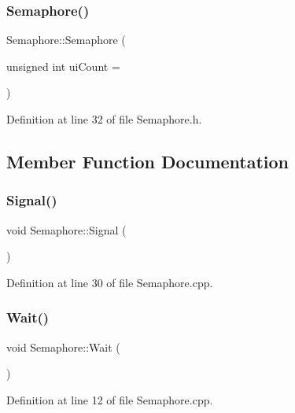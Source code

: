 \subsubsection{\texorpdfstring{Semaphore()}{Semaphore()}}
{\footnotesize\ttfamily Semaphore\+::\+Semaphore (\begin{DoxyParamCaption}\item[{unsigned int}]{ui\+Count = {} }\end{DoxyParamCaption})\hspace{0.3cm}{\ttfamily [inline]}}



Definition at line 32 of file Semaphore.\+h.



\subsection{Member Function Documentation}
\mbox{\label{class_semaphore_a86f92f738b4486439b296d8e235895f2}} 
\subsubsection{\texorpdfstring{Signal()}{Signal()}}
{\footnotesize\ttfamily void Semaphore\+::\+Signal (\begin{DoxyParamCaption}{ }\end{DoxyParamCaption})}



Definition at line 30 of file Semaphore.\+cpp.

\mbox{\label{class_semaphore_a72aabebf026e3a8b1f3e4d0fa8ee1eda}} 
\subsubsection{\texorpdfstring{Wait()}{Wait()}\hspace{0.1cm}{\footnotesize\ttfamily [1/2]}}
{\footnotesize\ttfamily void Semaphore\+::\+Wait (\begin{DoxyParamCaption}{ }\end{DoxyParamCaption})}



Definition at line 12 of file Semaphore.\+cpp.

